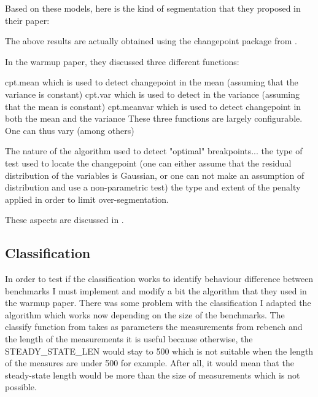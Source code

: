 \documentclass{article}
\begin{document}
Based on these models, here is the kind of segmentation that they proposed in their paper:

The above results are actually obtained using the changepoint package from \citep{killick2014changepoint}.

In the warmup paper, they discussed three different functions:

cpt.mean which is used to detect changepoint in the mean (assuming that the variance is constant)
cpt.var which is used to detect  in the variance (assuming that the mean is constant)
cpt.meanvar which is used to detect changepoint in both the mean and the variance
These three functions are largely configurable. One can thus vary (among others)

The nature of the algorithm used to detect "optimal" breakpoints...
the type of test used to locate the changepoint (one can either assume that the residual distribution of the variables is Gaussian, or one can not make an assumption of distribution and use a non-parametric test)
the type and extent of the penalty applied in order to limit over-segmentation.

These aspects are discussed in \citep{killick2014changepoint}.

\subsection{Classification}

In order to test if the classification works to identify behaviour difference between benchmarks I must implement and modify a bit the algorithm that they used in the warmup paper.
There was some problem with the classification I adapted the algorithm which works now depending on the size of the benchmarks.
The classify function from \citep{barrett2017virtual} takes as parameters the measurements from rebench and the length of the measurements it is useful because otherwise, the STEADY\_STATE\_LEN would stay to 500 which is not suitable when the length of the measures are under 500 for example. After all, it would mean that the steady-state length would be more than the size of measurements which is not possible.
\end{document}
